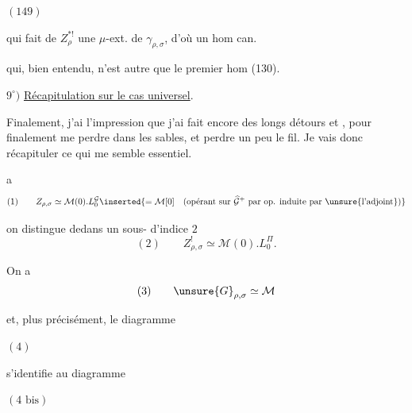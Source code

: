 \( (149) \)\quad
{}

qui fait de $Z_\rho^{*!}$ une $\mu$-ext. de $\gamma_{\rho,\sigma}$,
d'où un hom can.


qui, bien entendu, n'est autre que le premier hom (130).

$9^\circ)$ \uline{Récapitulation sur le cas universel}.

Finalement, j'ai l'impression que j'ai fait encore des longs détours et
, pour finalement me perdre dans les sables, et perdre un
peu le fil. Je vais donc récapituler ce qui me semble essentiel.

\textcircled{a}
\[
(1)\qquad Z_{\rho,\sigma}\simeq\mathcal M(0).L_0^{\mathcal G}
\inserted{=\mathcal M[0]\quad
\text{(opérant sur }\widehat{\mathcal G}^{+}\text{ par op. induite par }\unsure{\text{l'adjoint}}\text{)}}
\]

on distingue dedans un sous- d'indice $2$
\[
(2)\qquad Z_{\rho,\sigma}^{!}\simeq\mathcal M(0).L_0^{\Pi}.
\]


On a
\[
(3)\qquad \unsure{G}_{\rho,\sigma}\simeq\mathcal M
\]

et,  plus précisément, le diagramme

\( (4) \)\quad
{}

s'identifie au diagramme

\( (4\text{ bis}) \)\quad
{}

